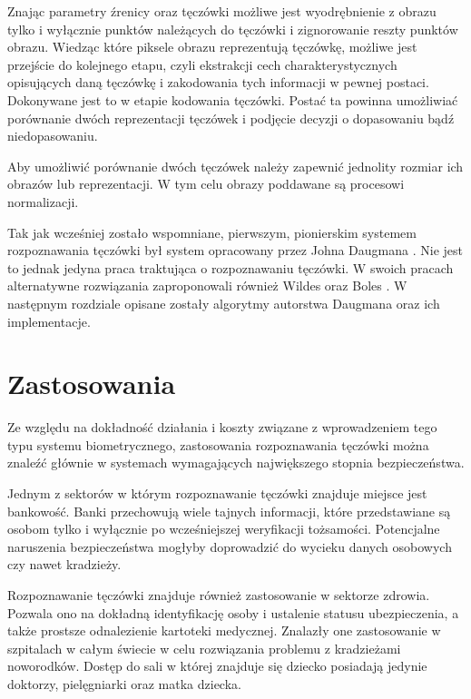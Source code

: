\documentclass[10pt,polish,a4paper,oneside]{ppfcmthesis}
\begin{document}
Znając parametry \'zrenicy oraz tęczówki możliwe jest wyodrębnienie z obrazu tylko i wyłącznie
punktów należących do tęczówki i zignorowanie reszty punktów obrazu. Wiedząc które piksele obrazu
reprezentują tęczówkę, możliwe jest przejście do kolejnego etapu, czyli ekstrakcji cech charakterystycznych
opisujących daną tęczówkę i zakodowania tych informacji w pewnej postaci. Dokonywane jest to w etapie kodowania
tęczówki. Posta\'c ta powinna umożliwia\'c porównanie dwóch reprezentacji tęczówek i podjęcie decyzji o dopasowaniu
bąd\'z niedopasowaniu.

Aby umożliwi\'c porównanie dwóch tęczówek należy zapewni\'c jednolity rozmiar
ich obrazów lub reprezentacji. W tym celu obrazy poddawane są procesowi normalizacji.

Tak jak wcześniej zostało wspomniane, pierwszym, pionierskim systemem rozpoznawania tęczówki był
system opracowany przez Johna Daugmana \cite{DaugmanHowIrisRecognitionWorks}. Nie jest to jednak
jedyna praca traktująca o rozpoznawaniu tęczówki. W swoich pracach alternatywne rozwiązania
zaproponowali również Wildes \cite{Wildes} oraz Boles \cite{Boles}. W następnym rozdziale opisane
zostały algorytmy autorstwa Daugmana oraz ich implementacje.

\section{Zastosowania}

Ze względu na dokładnoś\'c działania i koszty związane z wprowadzeniem tego typu systemu
biometrycznego, zastosowania rozpoznawania tęczówki można znale\'z\'c głównie w systemach
wymagających największego stopnia bezpieczeństwa.

Jednym z sektorów w którym rozpoznawanie tęczówki znajduje miejsce jest bankowoś\'c. Banki
przechowują wiele tajnych informacji, które przedstawiane są osobom tylko i wyłącznie
po wcześniejszej weryfikacji tożsamości. Potencjalne naruszenia bezpieczeństwa mogłyby doprowadzi\'c
do wycieku danych osobowych czy nawet kradzieży.

Rozpoznawanie tęczówki znajduje również zastosowanie w sektorze zdrowia. Pozwala ono na dokładną
identyfikację osoby i ustalenie statusu ubezpieczenia, a także prostsze odnalezienie kartoteki
medycznej. Znalazły one zastosowanie w szpitalach w całym świecie w celu rozwiązania problemu z
kradzieżami noworodków. Dostęp do sali w której znajduje się dziecko posiadają jedynie doktorzy,
pielęgniarki oraz matka dziecka.
\end{document}
